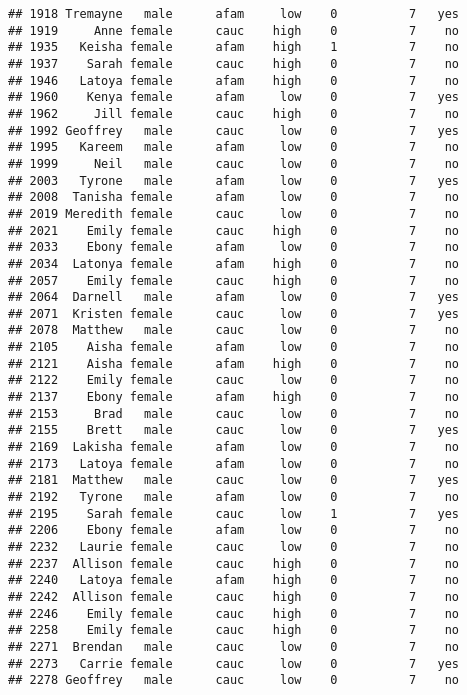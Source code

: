 \documentclass[
]{article}
\begin{document}
\begin{verbatim}
## 1918 Tremayne   male      afam     low    0          7   yes
## 1919     Anne female      cauc    high    0          7    no
## 1935   Keisha female      afam    high    1          7    no
## 1937    Sarah female      cauc    high    0          7    no
## 1946   Latoya female      afam    high    0          7    no
## 1960    Kenya female      afam     low    0          7   yes
## 1962     Jill female      cauc    high    0          7    no
## 1992 Geoffrey   male      cauc     low    0          7   yes
## 1995   Kareem   male      afam     low    0          7    no
## 1999     Neil   male      cauc     low    0          7    no
## 2003   Tyrone   male      afam     low    0          7   yes
## 2008  Tanisha female      afam     low    0          7    no
## 2019 Meredith female      cauc     low    0          7    no
## 2021    Emily female      cauc    high    0          7    no
## 2033    Ebony female      afam     low    0          7    no
## 2034  Latonya female      afam    high    0          7    no
## 2057    Emily female      cauc    high    0          7    no
## 2064  Darnell   male      afam     low    0          7   yes
## 2071  Kristen female      cauc     low    0          7   yes
## 2078  Matthew   male      cauc     low    0          7    no
## 2105    Aisha female      afam     low    0          7    no
## 2121    Aisha female      afam    high    0          7    no
## 2122    Emily female      cauc     low    0          7    no
## 2137    Ebony female      afam    high    0          7    no
## 2153     Brad   male      cauc     low    0          7    no
## 2155    Brett   male      cauc     low    0          7   yes
## 2169  Lakisha female      afam     low    0          7    no
## 2173   Latoya female      afam     low    0          7    no
## 2181  Matthew   male      cauc     low    0          7   yes
## 2192   Tyrone   male      afam     low    0          7    no
## 2195    Sarah female      cauc     low    1          7   yes
## 2206    Ebony female      afam     low    0          7    no
## 2232   Laurie female      cauc     low    0          7    no
## 2237  Allison female      cauc    high    0          7    no
## 2240   Latoya female      afam    high    0          7    no
## 2242  Allison female      cauc    high    0          7    no
## 2246    Emily female      cauc    high    0          7    no
## 2258    Emily female      cauc    high    0          7    no
## 2271  Brendan   male      cauc     low    0          7    no
## 2273   Carrie female      cauc     low    0          7   yes
## 2278 Geoffrey   male      cauc     low    0          7    no

\end{verbatim}
\end{document}
